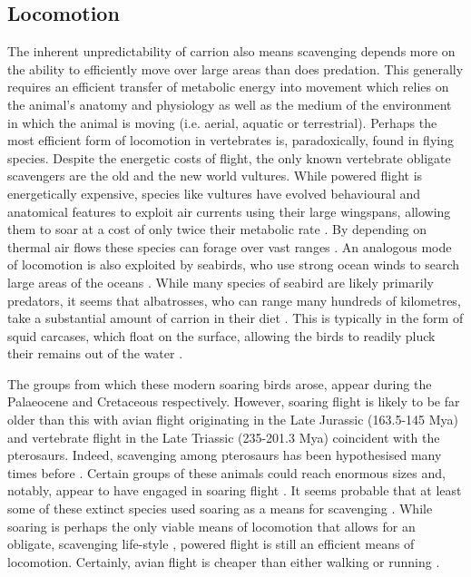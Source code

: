 \documentclass[a4paper,12pt]{article}
\begin{document}
\subsection*{Locomotion}
The inherent unpredictability of carrion also means scavenging depends more on the ability to efficiently move over large areas than does predation.
This generally requires an efficient transfer of metabolic energy into movement which relies on the animal's anatomy and physiology as well as the medium of the environment in which the animal is moving (i.e. aerial, aquatic or terrestrial).
Perhaps the most efficient form of locomotion in vertebrates is, paradoxically, found in flying species. 
Despite the energetic costs of flight, the only known vertebrate obligate scavengers are the old and the new world vultures. 
While powered flight is energetically expensive, species like vultures have evolved behavioural and anatomical features to exploit air currents using their large wingspans, allowing them to soar at a cost of only twice their metabolic rate \citep{hedenstrom1993migration,spivey2014analysing}.
By depending on thermal air flows these species can forage over vast ranges \citep{spiegel2013factors}. 
An analogous mode of locomotion is also exploited by seabirds, who use strong ocean winds to search large areas of the oceans \citep{norberg2012vertebrate,thaxter2012seabird}. 
While many species of seabird are likely primarily predators, it seems that albatrosses, who can range many hundreds of kilometres, take a substantial amount of carrion in their diet \citep{croxall1994dead}. 
This is typically in the form of squid carcases, which float on the surface, allowing the birds to readily pluck their remains out of the water \citep{croxall1994dead}. 

The groups from which these modern soaring birds arose, appear during the Palaeocene \citep[66 - 56 Million years ago (Mya); ][]{Jetz2012, Jarvis2014} and Cretaceous \citep{chiappe2006early} respectively. 
However, soaring flight is likely to be far older than this with avian flight originating in the Late Jurassic (163.5-145 Mya) and vertebrate flight in the Late Triassic (235-201.3 Mya) coincident with the pterosaurs. 
Indeed, scavenging among pterosaurs has been hypothesised many times before \citep{witton2008reappraisal}. 
Certain groups of these animals could reach enormous sizes \citep[e.g. Azhdarchids with wingspans of 11 metres; ][]{witton2010size} and, notably, appear to have engaged in soaring flight \citep{witton2010size}.
It seems probable that at least some of these extinct species used soaring as a means for scavenging \citep{witton2013pterosaurs}. 
While soaring is perhaps the only viable means of locomotion that allows for an obligate, scavenging life-style \citep{ruxton2004obligate}, powered flight is still an efficient means of locomotion. 
Certainly, avian flight is cheaper than either walking or running \citep{tucker1975energetic}.
\end{document}
